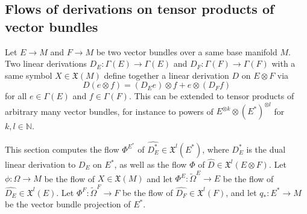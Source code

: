 \documentclass{amsart}
\theoremstyle{plain}
\newcommand{\N}{\mathbb{N}}
\newcommand{\mx}{\mathfrak{X}}
\begin{document}
\subsection{Flows of derivations on tensor products of vector bundles}\label{constr_conn}
Let $E\to M$ and $F\to M$ be two vector bundles over a same base manifold $M$.
Two linear derivations $D_ E\colon\Gamma(E)\to\Gamma(E)$ and $D_ F\colon\Gamma(F)\to\Gamma(F)$ with a same symbol $X\in\mx(M)$ define together a linear derivation $D$ on $E\otimes F$ via 
\[ D(e\otimes f)=(D_Ee)\otimes f+ e\otimes(D_Ff)
\]
for all  $e\in\Gamma(E)$ and $f\in\Gamma(F)$. This can be extended to tensor products of arbitrary many vector bundles, for instance to powers of $E^{\otimes k}\otimes (E^*)^{\otimes l}$ for $k,l\in\N$.

This section computes the flow $\Phi^{E^*}$ of $\widehat{D_ E^*}\in\mx^l(E^*)$, where $D_ E^*$ is the dual linear derivation to $D_E$  on $E^*$, as well as the flow $\Phi$ of $\widehat{D}\in\mx^l(E\otimes F)$.
Let $\phi\colon \Omega\to M$ be the flow of $X\in\mx(M)$ and let $\Phi^E\colon \widetilde\Omega^E\to E$ be the flow of $\widehat{D_ E}\in\mx^l(E)$. Let $\Phi^F\colon \widetilde\Omega^F\to F$ be the flow of $\widehat{D_F}\in\mx^l(F)$, and let $q_ *\colon E^*\to M$ be the vector bundle projection of $E^*$.
\end{document}
